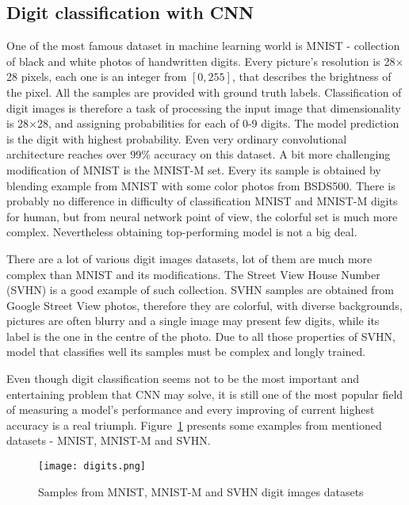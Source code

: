 \documentclass{article}
\begin{document}
\subsection{Digit classification with CNN}
One of the most famous dataset in machine learning world is MNIST - collection of black and white photos of handwritten digits. Every picture's resolution is 28$\times$28 pixels, each one is an integer from $[0,255]$, that describes the brightness of the pixel. All the samples are provided with ground truth labels. Classification of digit images is therefore a task of processing the input image that dimensionality is 28$\times$28, and assigning probabilities for each of 0-9 digits. The model prediction is the digit with highest probability. Even very ordinary convolutional architecture reaches over 99\% accuracy on this dataset. A bit more challenging modification of MNIST is the MNIST-M set. Every its sample is obtained by blending example from MNIST with some color photos from BSDS500. There is probably no difference in difficulty of classification MNIST and MNIST-M digits for human, but from neural network point of view, the colorful set is much more complex. Nevertheless obtaining top-performing model is not a big deal.
\par
There are a lot of various digit images datasets, lot of them are much more complex than MNIST and its modifications. The Street View House Number (SVHN) is a good example of such collection. SVHN samples are obtained from Google Street View photos, therefore they are colorful, with diverse backgrounds, pictures are often blurry and a single image may present few digits, while its label is the one in the centre of the photo. Due to all those properties of SVHN, model that classifies well its samples must be complex and longly trained. 
\par
Even though digit classification seems not to be the most important and entertaining problem that CNN may solve, it is still one of the most popular field of measuring a model's performance and every improving of current highest accuracy is a real triumph. Figure~\ref{fig:digits} presents some examples from mentioned datasets - MNIST, MNIST-M and SVHN.

\begin{figure}%
    \centering
    \texttt{[image: digits.png]}%
    \caption{Samples from MNIST, MNIST-M and SVHN digit images datasets}
    \label{fig:digits}%
\end{figure}
\end{document}
